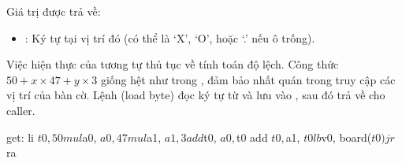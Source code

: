 Giá trị được trả về:
\begin{itemize}
    \item {}: Ký tự tại vị trí đó (có thể là `X', `O', hoặc `.' nếu ô trống).
\end{itemize}

Việc hiện thực của  tương tự thủ tục  về tính toán độ lệch. Công thức \( 50 + x \times 47 + y \times 3 \) giống hệt như trong , đảm bảo nhất quán trong truy cập các vị trí của bàn cờ. Lệnh  (load byte) đọc ký tự từ  và lưu vào , sau đó trả về cho caller.

\begin{code}
get:
	li $t0, 50
	mul $a0, $a0, 47
	mul $a1, $a1, 3
	add $t0, $a0, $t0
	add $t0, $a1, $t0
	lb 	$v0, board($t0)
	
	jr $ra
\end{code}